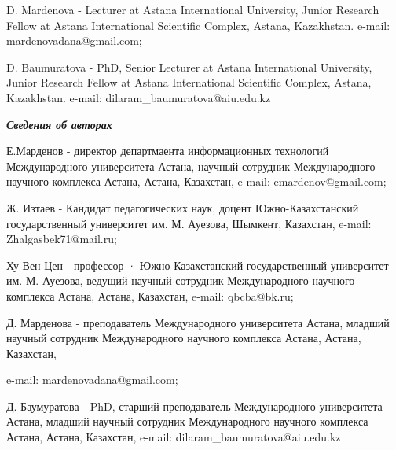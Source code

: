 D. Mardenova - Lecturer at Astana International University, Junior
Research Fellow at Astana International Scientific Complex, Astana,
Kazakhstan. e-mail: mardenovadana@gmail.com;

D. Baumuratova - PhD, Senior Lecturer at Astana International
University, Junior Research Fellow at Astana International Scientific
Complex, Astana, Kazakhstan. e-mail: dilaram\_baumuratova@aiu.edu.kz

\emph{{\bfseries Сведения об авторах}}

Е.Марденов - директор департмаента информационных технологий
Международного университета Астана, научный сотрудник Международного
научного комплекса Астана, Астана, Казахстан, e-mail:
emardenov@gmail.com;

Ж. Изтаев - Кандидат педагогических наук, доцент Южно-Казахстанский
государственный университет им. М. Ауезова, Шымкент, Казахстан, e-mail:
Zhalgasbek71@mail.ru;

Ху Вен-Цен - профессор · Южно-Казахстанский государственный университет
им. М. Ауезова, ведущий научный сотрудник Международного научного
комплекса Астана, Астана, Казахстан, e-mail: qbcba@bk.ru;

Д. Марденова - преподаватель Международного университета Астана, младший
научный сотрудник Международного научного комплекса Астана, Астана,
Казахстан,

e-mail: mardenovadana@gmail.com;

Д. Баумуратова - PhD, старший преподаватель Международного университета
Астана, младший научный сотрудник Международного научного комплекса
Астана, Астана, Казахстан, e-mail: dilaram\_baumuratova@aiu.edu.kz

